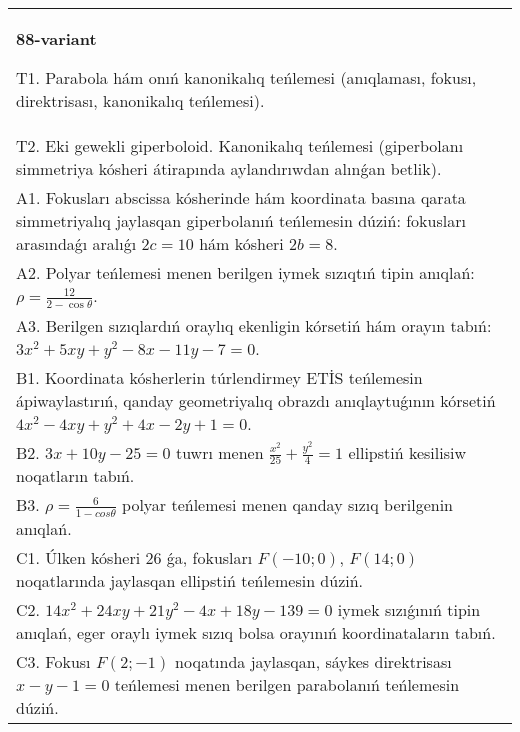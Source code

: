 \documentclass{article}
\begin{document}
\begin{tabular}{m{17cm}}
\textbf{88-variant}
\newline

T1. Parabola hám onıń kanonikalıq teńlemesi (anıqlaması, fokusı, direktrisası, kanonikalıq teńlemesi).\\

T2. Eki gewekli giperboloid. Kanonikalıq teńlemesi (giperbolanı simmetriya kósheri átirapında aylandırıwdan alınǵan betlik).\\

A1. Fokusları abscissa kósherinde hám koordinata basına qarata simmetriyalıq jaylasqan giperbolanıń teńlemesin dúziń: fokusları arasındaǵı aralıǵı $2 c=10$ hám kósheri $2 b=8$.\\

A2. Polyar teńlemesi menen berilgen iymek sızıqtıń tipin anıqlań: $\rho=\frac{12}{2-\cos\theta}$.\\

A3. Berilgen sızıqlardıń oraylıq ekenligin kórsetiń hám orayın tabıń: $3 x^{2}+5 xy+y^{2}-8 x-11 y-7=0$.\\

B1. Koordinata kósherlerin túrlendirmey ETİS teńlemesin ápiwaylastırıń, qanday geometriyalıq obrazdı anıqlaytuǵının kórsetiń $4x^{2} - 4xy + y^{2} + 4x - 2y + 1 = 0$.  \\

B2. $3x + 10y - 25 = 0$ tuwrı menen $\frac{x^{2}}{25} + \frac{y^{2}}{4} = 1$ ellipstiń kesilisiw noqatların tabıń.\\

B3. $\rho = \frac{6}{1 - cos\theta}$ polyar teńlemesi menen qanday sızıq berilgenin anıqlań.  \\

C1. Úlken kósheri 26 ǵa, fokusları $F( - 10;0)$, $F(14;0)$ noqatlarında jaylasqan ellipstiń teńlemesin dúziń.  \\

C2. $14x^{2} + 24xy + 21y^{2} - 4x + 18y - 139 = 0$ iymek sızıǵınıń tipin anıqlań, eger oraylı iymek sızıq bolsa orayınıń koordinataların tabıń.  \\

C3. Fokusı $F(2; - 1)$ noqatında jaylasqan, sáykes direktrisası $x - y - 1 = 0$ teńlemesi menen berilgen parabolanıń teńlemesin dúziń.  \\

\end{tabular}
\vspace{1cm}
\end{document}

